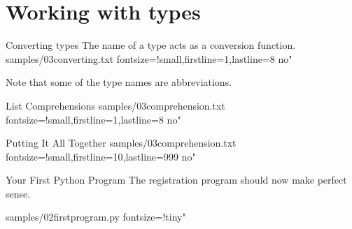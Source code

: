 \documentclass{pyslides}
\begin{document}
\section{Working with types}

\begin{frame}[fragile]{Converting types}
The name of a type acts as a conversion function.
 samples/03converting.txt fontsize=!small,firstline=1,lastline=8 no"

\bigskip

Note that some of the type names are abbreviations.
\end{frame}

\begin{frame}[fragile]{List Comprehensions}
 samples/03comprehension.txt fontsize=!small,firstline=1,lastline=8 no"
\end{frame}

\begin{frame}[fragile]{Putting It All Together}
 samples/03comprehension.txt fontsize=!small,firstline=10,lastline=999 no"
\end{frame}

\begin{frame}[fragile]{Your First Python Program}
The registration program should now make perfect sense.

\bigskip

 samples/02firstprogram.py fontsize=!tiny"

\bigskip
\end{frame}
\end{document}
